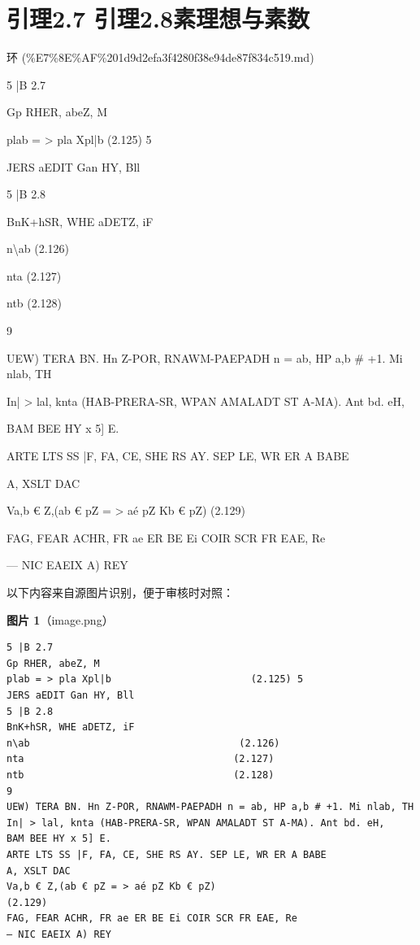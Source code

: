 \section*{引理2.7 引理2.8素理想与素数}

\begin{note}[来源上级主题]

环 (\%E7\%8E\%AF\%201d9d2efa3f4280f38e94de87f834c519.md)

\end{note}

\begin{lemma}[引理2.7 引理2.8素理想与素数]

5 |B 2.7

Gp RHER, abeZ, M

plab = > pla Xpl|b                        (2.125) 5

JERS aEDIT Gan HY, Bll

5 |B 2.8

BnK+hSR, WHE aDETZ, iF

n\textbackslash{}ab                                    (2.126)

nta                                    (2.127)

ntb                                    (2.128)

9

UEW) TERA BN. Hn Z-POR, RNAWM-PAEPADH n = ab, HP a,b \# +1. Mi nlab, TH

In| > lal, knta (HAB-PRERA-SR, WPAN AMALADT ST A-MA). Ant bd. eH,

BAM BEE HY x 5] E.

ARTE LTS SS |F, FA, CE, SHE RS AY. SEP LE, WR ER A BABE

A, XSLT DAC

Va,b € Z,(ab € pZ = > aé pZ Kb € pZ)                             (2.129)

FAG, FEAR ACHR, FR ae ER BE Ei COIR SCR FR EAE, Re

— NIC EAEIX A) REY

\end{lemma}

\begin{note}
以下内容来自源图片识别，便于审核时对照：

\textbf{图片 1}（image.png）
\begin{Verbatim}[fontsize=\small]
5 |B 2.7
Gp RHER, abeZ, M
plab = > pla Xpl|b                        (2.125) 5
JERS aEDIT Gan HY, Bll
5 |B 2.8
BnK+hSR, WHE aDETZ, iF
n\ab                                    (2.126)
nta                                    (2.127)
ntb                                    (2.128)
9
UEW) TERA BN. Hn Z-POR, RNAWM-PAEPADH n = ab, HP a,b # +1. Mi nlab, TH
In| > lal, knta (HAB-PRERA-SR, WPAN AMALADT ST A-MA). Ant bd. eH,
BAM BEE HY x 5] E.
ARTE LTS SS |F, FA, CE, SHE RS AY. SEP LE, WR ER A BABE
A, XSLT DAC
Va,b € Z,(ab € pZ = > aé pZ Kb € pZ)                             (2.129)
FAG, FEAR ACHR, FR ae ER BE Ei COIR SCR FR EAE, Re
— NIC EAEIX A) REY
\end{Verbatim}

\end{note}

